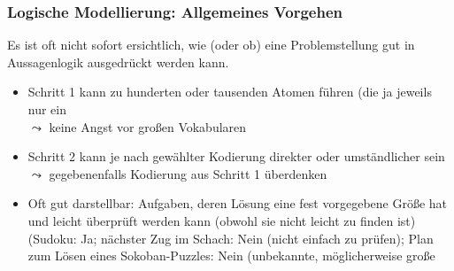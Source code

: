 \documentclass[aspectratio=1610,onlymath]{beamer}
\let\beameroriginaldoublebackslash\\
\let\\=\beameroriginaldoublebackslash
\begin{document}
\begin{frame}\frametitle{Logische Modellierung: Allgemeines Vorgehen}

Es ist oft nicht sofort ersichtlich, wie (oder ob) eine Problemstellung
gut in Aussagenlogik ausgedrückt werden kann.
\medskip


\medskip
\begin{itemize}
\item Schritt 1 kann zu hunderten oder tausenden Atomen führen (die ja jeweils nur ein \\ $\leadsto$ keine Angst vor großen Vokabularen
\item Schritt 2 kann je nach gewählter Kodierung direkter oder umständlicher sein\\ $\leadsto$ gegebenenfalls Kodierung aus Schritt 1 überdenken
\item Oft gut darstellbar: Aufgaben, deren Lösung eine fest vorgegebene Größe hat und leicht überprüft werden kann (obwohl sie nicht leicht zu finden ist)\\
(Sudoku: Ja; nächster Zug im Schach: Nein (nicht einfach zu prüfen); Plan zum Lösen eines Sokoban-Puzzles: Nein (unbekannte, möglicherweise große 
\end{itemize}

\end{frame}



\newcommand{\emphcell}[1]{\only<#1>{\cellcolor{strongyellow}}}
\end{document}
